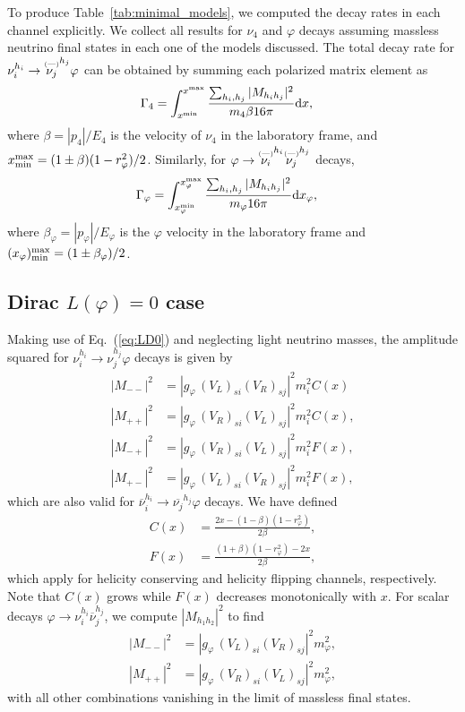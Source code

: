 \documentclass[
reprint,
superscriptaddress,
showpacs,
preprintnumbers,
nofootinbib,
nobibnotes,
amsmath,
amssymb, 
aps,
prd,
floatfix
]{revtex4-1}
\newcommand{\refeq}[1]{Eq.~(\ref{#1})}
\newcommand{\reftab}[1]{Table~\ref{#1}}
\renewcommand{\phi}{\varphi}
\begin{document}
To produce \reftab{tab:minimal_models}, we computed the decay rates in each channel explicitly. We collect all results for $\nu_4$ and $\phi$ decays assuming massless neutrino final states in each one of the models discussed. The total decay rate for $\nu_i^{h_i}\to\overset{\scriptscriptstyle(\text{\textemdash})}{\nu_j}^{h_j} \phi$ can be obtained by summing each polarized matrix element as
\begin{align}
    \Gamma_4 &= \int_{x^{\rm min}}^{x^{\rm max}} \frac{\sum_{h_i,h_j}|M_{h_i h_j}|^2}{m_4 \beta 16 \pi }\dd x,
\end{align}
where $\beta=|p_{4}|/E_{4}$ is the velocity of $\nu_4$ in the laboratory frame, and $x^{\rm max}_{\rm min} =  (1\pm\beta)(1-r_\phi^2)/2$. Similarly, for $\phi\to\overset{\scriptscriptstyle(\text{\textemdash})}{\nu_i}^{h_i}\overset{\scriptscriptstyle(\text{\textemdash})}{\nu_j}^{h_j}$ decays,
\begin{align}    
\Gamma_\phi &= \int_{x_\phi^{\rm min}}^{x_\phi^{\rm max}} \frac{\sum_{h_i,h_j}|M_{h_i h_j}|^2}{ m_\phi 16\pi} \dd x_\phi,
\end{align}    
where $\beta_\phi=|p_\phi|/E_\phi$ is the $\phi$ velocity in the laboratory frame and $(x_\phi)^{\rm max}_{\rm min} = (1\pm \beta_\phi)/2$. 


\subsection{Dirac $L(\phi)=0$ case}

Making use of \refeq{eq:LD0} and neglecting light neutrino masses, the amplitude squared for $\nu_i^{h_i}\to\nu_j^{h_j} \phi$ decays is given by
\begin{align}
    |M_{--}|^2 &= |g_\phi\,(V_L)_{si} (V_R)_{sj}|^2 m_i^2 C(x)
    \\
    |M_{++}|^2 &= |g_\phi\,(V_R)_{si} (V_L)_{sj}|^2 m_i^2 C(x),
    \\
    |M_{-+}|^2 &= |g_\phi\,(V_R)_{si} (V_L)_{sj}|^2 m_i^2 F(x),
    \\
    |M_{+-}|^2 &= |g_\phi\,(V_L)_{si} (V_R)_{sj}|^2 m_i^2 F(x),
\end{align}
which are also valid for $\overline{\nu}_i^{h_i}\to\overline{\nu_j}^{h_j} \phi$ decays. We have defined
\begin{align}
    C(x) &=\frac{2 x - (1-\beta)(1-r_\phi^2)}{2\beta},\\
    F(x) &=\frac{(1+\beta)(1-r_\phi^2)-2x}{2\beta},
\end{align}
which apply for helicity conserving and helicity flipping channels, respectively. Note that $C(x)$ grows while $F(x)$ decreases monotonically with $x$.
For scalar decays $\phi \to \nu^{h_i}_i \overline{\nu}^{h_j}_j$, we compute $|M_{h_1 h_2}|^2$ to find
\begin{align}
    |M_{--}|^2 &= |g_\phi\,(V_L)_{si} (V_R)_{sj}|^2 m_\phi^2,
    \\
    |M_{++}|^2 &= |g_\phi\,(V_R)_{si} (V_L)_{sj}|^2 m_\phi^2,
\end{align}
with all other combinations vanishing in the limit of massless final states. 
\end{document}
